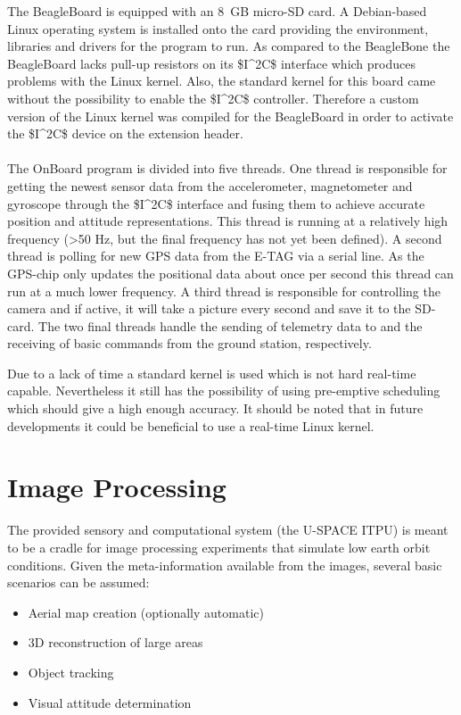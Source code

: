The BeagleBoard is equipped with an 8~GB micro-\ac{SD} card. A Debian-based Linux operating system is installed onto the card providing the environment, libraries and drivers for the program to run. As compared to the BeagleBone the
BeagleBoard lacks pull-up resistors on its \ac{$I^2C$} interface which produces problems with the Linux kernel. Also, the standard kernel for this board came without the possibility to enable the \ac{$I^2C$} controller. Therefore a custom version of the Linux kernel was compiled for the BeagleBoard in order to activate the \ac{$I^2C$} device on the extension header. 
\\
\\
The OnBoard program is divided into five threads. One thread is responsible for getting the newest sensor data from the accelerometer, magnetometer and gyroscope through the \ac{$I^2C$} interface and fusing them to achieve accurate position and attitude representations. This thread is running at a relatively high frequency (>50 Hz, but the final frequency has not yet been defined).  A second thread is polling for new \ac{GPS} data from the E-TAG via a serial line. As the \ac{GPS}-chip only updates the positional data about once per second this thread can run at a much lower frequency. A third thread is responsible for controlling the camera and if active, it will take a picture every second and save it to the \ac{SD}-card. The two final threads handle the sending of telemetry data to and the receiving of basic commands from the ground station, respectively.

\noindent
Due to a lack of time a standard kernel is used which is not hard real-time capable. Nevertheless it still has the possibility of using pre-emptive scheduling which should give a high enough accuracy. It should be noted that in future
developments it could be beneficial to use a real-time Linux kernel.

\FloatBarrier
\section{Image Processing}

The provided sensory and computational system (the \ac{U-SPACE} \ac{ITPU}) is meant to be a cradle for image processing experiments that simulate low earth orbit conditions. Given the meta-information available from the images, several basic scenarios can be assumed:

\begin{itemize}
\item Aerial map creation (optionally automatic)
\item 3D reconstruction of large areas
\item Object tracking
\item Visual attitude determination
\end{itemize}

